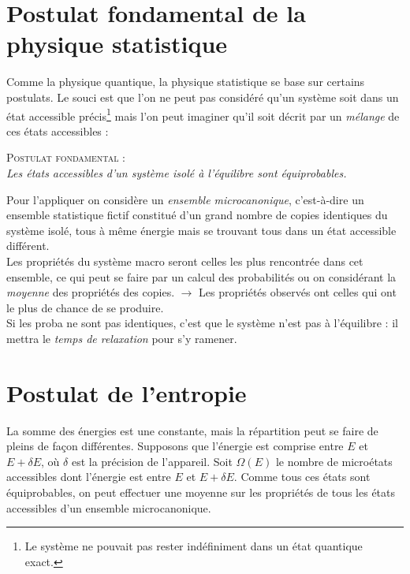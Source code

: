 \documentclass	[11pt, a4paper, openany]{book}
\begin{document}
\section{Postulat fondamental de la physique statistique}
Comme la physique quantique, la physique statistique se base sur certains postulats. Le souci est 
que l'on ne peut pas considéré qu'un système soit dans un état accessible précis\footnote{Le système
ne pouvait pas rester indéfiniment dans un état quantique exact.} mais l'on peut imaginer qu'il soit 
décrit par un \textit{mélange} de ces états accessibles :
\begin{center}
\textsc{Postulat fondamental} :\\
\textit{Les états accessibles d'un système isolé à l'équilibre sont équiprobables.}
\end{center}
Pour l'appliquer on considère un \textit{ensemble microcanonique}, c'est-à-dire un ensemble statistique
fictif constitué d'un grand nombre de copies identiques du système isolé, tous à même énergie mais se 
trouvant tous dans un état accessible différent.\\
Les propriétés du système macro seront celles les plus rencontrée dans cet ensemble, ce qui peut se
faire par un calcul des probabilités ou on considérant la \textit{moyenne} des propriétés des copies.
$\rightarrow$ Les propriétés observés ont celles qui ont le plus de chance de se produire.\\
Si les proba ne sont pas identiques, c'est que le système n'est pas à l'équilibre : il mettra le 
\textit{temps de relaxation} pour s'y ramener.


\section{Postulat de l'entropie}
La somme des énergies est une constante, mais la répartition peut se faire de pleins de façon 
différentes. Supposons que l'énergie est comprise entre $E$ et $E+\delta E$, où $\delta$ est la
précision de l'appareil. Soit $\Omega(E)$ le nombre de microétats accessibles dont l'énergie est
entre $E$ et $E+\delta E$. Comme tous ces états sont équiprobables, on peut effectuer une moyenne
sur les propriétés de tous les états accessibles d'un ensemble microcanonique.\\
\end{document}
